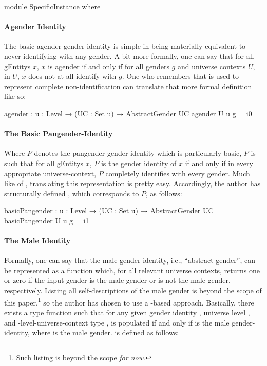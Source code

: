 \documentclass{article}
\theoremstyle{remark}
\begin{document}
\begin{code}
  module SpecificInstance where
\end{code}

\paragraph{Agender Identity}
The basic agender gender-identity is simple in being materially equivalent to never identifying with any gender.  A bit more formally, one can say that for all \glspl{gEntity} \(x\), \(x\) is agender if and only if for all genders \(g\) and universe contexts \(U\), in \(U\), \(x\) does not at all identify with \(g\).  One who remembers that  is used to represent complete non-identification can translate that more formal definition like so:

\begin{code}
    agender : {u : Level} → (UC : Set u) → AbstractGender UC
    agender U u g = i0
\end{code}

\paragraph{The Basic Pangender-Identity}\label{sec:gender8exampleIdentityPangenderBasic}
Where \(P\) denotes the pangender gender-identity which is particularly basic, \(P\) is such that for all \glspl{gEntity} \(x\), \(P\) is the gender identity of \(x\) if and only if in every appropriate universe-context, \(P\) completely identifies with every gender.  Much like  of , translating this representation is pretty easy.  Accordingly, the author has structurally defined , which corresponds to \(P\), as follows:

\begin{code}
    basicPangender : {u : Level} → (UC : Set u) → AbstractGender UC
    basicPangender U u g = i1
\end{code}

\paragraph{The Male Identity}\label{sec:gender8exampleIdentityMale}
Formally, one can say that the male gender-identity, i.e., ``abstract gender'', can be represented as a function which, for all relevant universe contexts, returns one or zero if the input gender is the male gender or is not the male gender, respectively.  Listing all self-descriptions of the male gender is beyond the scope of this paper,\footnote{Such listing is beyond the scope \emph{for now}.} so the author has chosen to use a -based approach.  Basically, there exists a type function  such that for any given gender identity , universe level , and -level-universe-context type ,     is populated if and only if  is the male gender-identity, where  is the male gender.   is defined as follows:
\end{document}
